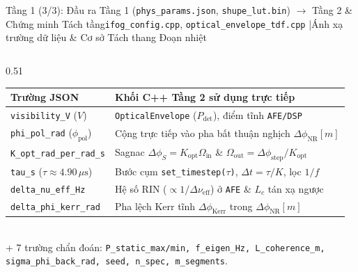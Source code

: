 \documentclass[aspectratio=169,8pt]{beamer}
\begin{document}
\begin{frame}{Tầng 1 (3/3): Đầu ra Tầng 1 (\texttt{phys\_params.json}, \texttt{shupe\_lut.bin}) $\to$ Tầng 2 \& Chứng minh Tách tầng}{\texttt{ifog\_config.cpp}, \texttt{optical\_envelope\_tdf.cpp} \enspace|\enspace Ánh xạ trường dữ liệu \& Cơ sở Tách thang Đoạn nhiệt}
\begin{columns}[T]
  \begin{column}{0.51\textwidth}
    \begin{eqbox}
      \tiny\setlength{\tabcolsep}{2.0pt}\renewcommand{\arraystretch}{1.06}
      \begin{tabularx}{\linewidth}{@{}p{1.85cm} >{\raggedright\arraybackslash}X@{}}
        \textbf{Trường JSON} & \textbf{Khối C++ Tầng 2 sử dụng trực tiếp} \\
        \midrule
        \texttt{visibility\_V} ($V$) & \texttt{OpticalEnvelope} ($P_{\text{det}}$), điểm tĩnh \texttt{AFE/DSP} \\
        \texttt{phi\_pol\_rad} ($\phi_{\text{pol}}$) & Cộng trực tiếp vào pha bất thuận nghịch $\Delta\phi_{\text{NR}}[m]$ \\
        \texttt{K\_opt\_rad\_per\_rad\_s} & Sagnac $\Delta\phi_S=K_{\text{opt}}\Omega_{\text{in}}$ \& $\Omega_{\text{out}}=\Delta\phi_{\text{step}}/K_{\text{opt}}$ \\
        \texttt{tau\_s} ($\tau\approx 4.90\,\mu\text{s}$) & Bước cụm \texttt{set\_timestep($\tau$)}, $\Delta t=\tau/K$, lọc $1/f$ \\
        \texttt{delta\_nu\_eff\_Hz} & Hệ số RIN ($\propto 1/\Delta\nu_{\text{eff}}$) ở \texttt{AFE} \& $L_c$ tán xạ ngược \\
        \texttt{delta\_phi\_kerr\_rad} & Pha lệch Kerr tĩnh $\Delta\phi_{\text{Kerr}}$ trong $\Delta\phi_{\text{NR}}[m]$ \\
      \end{tabularx}
      \vspace{1pt}\\
      {\tiny\color{AcadMuted} + 7 trường chẩn đoán: \texttt{P\_static\_max/min, f\_eigen\_Hz, L\_coherence\_m, sigma\_phi\_back\_rad, seed, n\_spec, m\_segments}.}
    \end{eqbox}
    \vspace{0.05cm}
    \begin{eqbox}

\end{eqbox}
\end{column}
\end{columns}
\end{frame}
\end{document}
